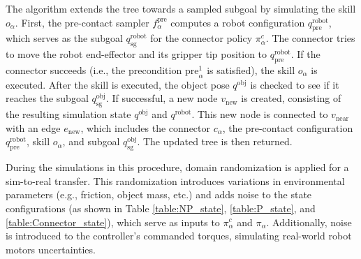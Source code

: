 The algorithm extends the tree towards a sampled subgoal by simulating the skill \( o_\alpha \). First, the pre-contact sampler \( f^{\text{pre}}_\alpha \) computes a robot configuration \( q^{\text{robot}}_{\text{pre}} \), which serves as the subgoal \( q^{\text{robot}}_{\text{sg}} \) for the connector policy \( \pi^c_\alpha \). The connector tries to move the robot end-effector and its gripper tip position to \( q^{\text{robot}}_{\text{pre}} \). If the connector succeeds (i.e., the precondition \( \mathrm{pre}^1_\alpha \) is satisfied), the skill \( o_\alpha \) is executed. After the skill is executed, the object pose \( q^{\text{obj}} \) is checked to see if it reaches the subgoal \( q^{\text{obj}}_{\text{sg}} \). If successful, a new node \( v_{\text{new}} \) is created, consisting of the resulting simulation state \( q^{\text{obj}} \) and \( q^{\text{robot}} \). This new node is connected to \( v_{\text{near}} \) with an edge \( e_{\text{new}} \), which includes the connector \( c_\alpha \), the pre-contact configuration \( q^{\text{robot}}_{\text{pre}} \), skill \( o_\alpha \), and subgoal \( q^{\text{obj}}_{\text{sg}} \). The updated tree is then returned. 

During the simulations in this procedure, domain randomization is applied for a sim-to-real transfer. This randomization introduces variations in environmental parameters (e.g., friction, object mass, etc.) and adds noise to the state configurations (as shown in Table \ref{table:NP_state}, \ref{table:P_state}, and \ref{table:Connector_state}), which serve as inputs to \( \pi^c_\alpha \) and \( \pi_\alpha \). Additionally, noise is introduced to the controller’s commanded torques, simulating real-world robot motors uncertainties.


